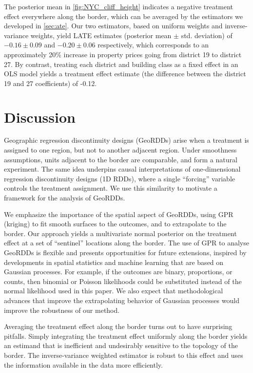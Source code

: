 \documentclass{article}
\begin{document}
The posterior mean in \autoref{fig:NYC_cliff_height} indicates a negative treatment effect everywhere along the border, which can be averaged by the estimators we developed in \autoref{sec:ate}.
Our two estimators, based on uniform weights and inverse-variance weights, yield LATE estimates (posterior mean \(\pm\) std. deviation) of \(-0.16\pm 0.09\) and \(-0.20 \pm 0.06\) respectively, which corresponds to an approximately 20\% increase in property prices going from district 19 to district 27.
By contrast, treating each district and building class as a fixed effect in an OLS model yields a treatment effect estimate (the difference between the district 19 and 27 coefficients) of -0.12. 

\section{Discussion}

Geographic regression discontinuity designs (GeoRDDs) arise when a treatment is assigned to one region, but not to another adjacent region.
Under smoothness assumptions, units adjacent to the border are comparable, and form a natural experiment.
The same idea underpins causal interpretations of one-dimensional regression discontinuity designs (1D RDDs), where a single ``forcing'' variable controls the treatment assignment.
We use this similarity to motivate a framework for the analysis of GeoRDDs.

We emphasize the importance of the spatial aspect of GeoRDDs, 
using GPR (kriging) to fit smooth surfaces to the outcomes, and to extrapolate to the border.
Our approach yields a multivariate normal posterior on the treatment effect at a set of ``sentinel'' locations along the border.
The use of GPR to analyse GeoRDDs is flexible and presents opportunities for future extensions, 
inspired by developments in spatial statistics and machine learning that are based on Gaussian processes.
For example, if the outcomes are binary, proportions, or counts, then binomial or Poisson likelihoods could be substituted instead of the normal likelihood used in this paper.
We also expect that methodological advances that improve the extrapolating behavior of Gaussian processes \citep[e.g.][]{wilson2013gaussian} would improve the robustness of our method.

Averaging the treatment effect along the border turns out to have surprising pitfalls.
Simply integrating the treatment effect uniformly along the border yields an estimand that is inefficient and undesirably sensitive to the topology of the border.
The inverse-variance weighted estimator is robust to this effect and uses the information available in the data more efficiently.
\end{document}
